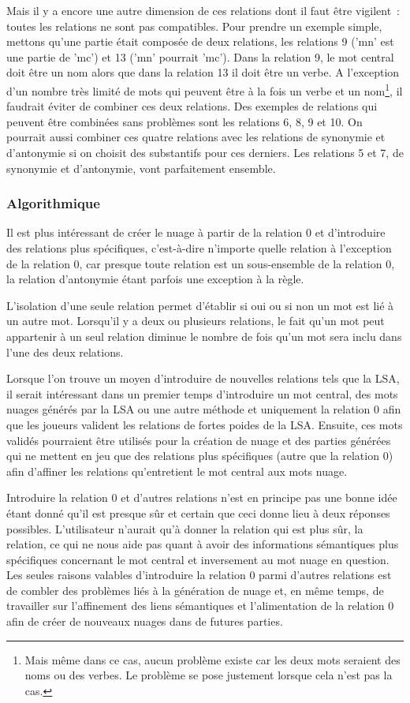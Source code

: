 \documentclass[a4paper,11pt,french]{article}
\begin{document}
Mais il y a encore une autre dimension de ces relations dont il faut être vigilent~: toutes les relations ne sont pas compatibles. Pour prendre un exemple simple, mettons qu'une partie était composée de deux relations, les relations 9 ('mn' est une partie de 'mc') et 13 ('mn' pourrait 'mc'). Dans la relation 9, le mot central doit être un nom alors que dans la relation 13 il doit être un verbe. A l'exception d'un nombre très limité de mots qui peuvent être à la fois un verbe et un nom\footnote{Mais même dans ce cas, aucun problème existe car les deux mots seraient des noms ou des verbes. Le problème se pose justement lorsque cela n'est pas la cas.}, il faudrait éviter de combiner ces deux relations. Des exemples de relations qui peuvent être combinées sans problèmes sont les relations 6, 8, 9 et 10. On pourrait aussi combiner ces quatre relations avec les relations de synonymie et d'antonymie si on choisit des substantifs pour ces derniers. Les relations 5 et 7, de synonymie et d'antonymie, vont parfaitement ensemble.


\subsubsection{Algorithmique}

Il est plus intéressant de créer le nuage à partir de la relation 0 et d'introduire des relations plus spécifiques, c'est-à-dire n'importe quelle relation à l'exception de la relation 0, car presque toute relation est un sous-ensemble de la relation 0, la relation d'antonymie étant parfois une exception à la règle. 

L'isolation d'une seule relation permet d'établir si oui ou si non un mot est lié à un autre mot. Lorsqu'il y a deux ou plusieurs relations, le fait qu'un mot peut appartenir à un seul relation diminue le nombre de fois qu'un mot sera inclu dans l'une des deux relations. 

Lorsque l'on trouve un moyen d'introduire de nouvelles relations tels que la LSA, il serait intéressant dans un premier temps d'introduire un mot central, des mots nuages générés par la LSA ou une autre méthode et uniquement la relation 0 afin que les joueurs valident les relations de fortes poides de la LSA. Ensuite, ces mots validés pourraient être utilisés pour la création de nuage et des parties générées qui ne mettent en jeu que des relations plus spécifiques (autre que la relation 0) afin d'affiner les relations qu'entretient le mot central aux mots nuage.  

Introduire la relation 0 et d'autres relations n'est en principe pas une bonne idée étant donné qu'il est presque sûr et certain que ceci donne lieu à deux réponses possibles. L'utilisateur n'aurait qu'à donner la relation qui est plus sûr, la relation, ce qui ne nous aide pas quant à avoir des informations sémantiques plus spécifiques concernant le mot central et inversement au mot nuage en question. Les seules raisons valables d'introduire la relation 0 parmi d'autres relations est de combler des problèmes liés à la génération de nuage et, en même temps, de travailler sur l'affinement des liens sémantiques et l'alimentation de la relation 0 afin de créer de nouveaux nuages dans de futures parties.   
\end{document}
